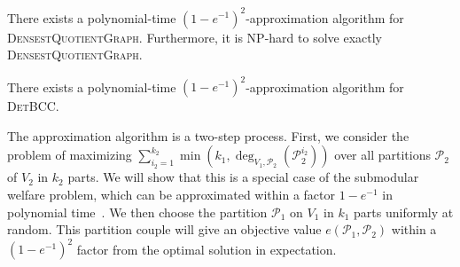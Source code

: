 \begin{theo}
  \label{theo:DQGapprox}
  There exists a polynomial-time $(1-e^{-1})^2$-approximation algorithm for \textsc{DensestQuotientGraph}. Furthermore, it is \textrm{NP}-hard to solve exactly \textsc{DensestQuotientGraph}.
\end{theo}

\begin{cor}
  \label{theo:DetBCCapprox}
  There exists a polynomial-time $(1-e^{-1})^2$-approximation algorithm for \textsc{DetBCC}.
\end{cor}

The approximation algorithm is a two-step process. First, we consider the problem of maximizing $\sum_{i_2=1}^{k_2}\min\left(k_1,\deg_{V_1,\mathcal{P}_2}(\mathcal{P}_2^{i_2})\right)$ over all partitions $\mathcal{P}_2$ of $V_2$ in $k_2$ parts. We will show that this is a special case of the submodular welfare problem, which can be approximated within a factor $1-e^{-1}$ in polynomial time~\cite{Vondrak08}. We then choose the partition $\mathcal{P}_1$ on $V_1$ in $k_1$ parts uniformly at random. This partition couple will give an objective value $e(\mathcal{P}_1,\mathcal{P}_2)$ within a $(1-e^{-1})^2$ factor from the optimal solution in expectation.

